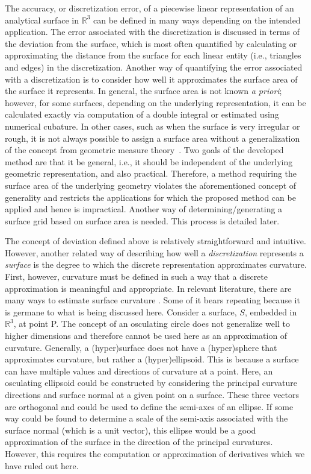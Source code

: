 The accuracy, or discretization error, of a piecewise linear
representation of an analytical surface in ${\mathbb R}^3$ can be
defined in many ways depending on the intended application. The error
associated with the discretization is discussed in terms of the
deviation from the surface, which is most often quantified by calculating 
or approximating the distance from the surface for each linear entity
(i.e., triangles and edges) in the discretization.  Another way of 
quantifying
the error associated with a discretization is to consider how well
it approximates the surface area of the surface it represents.  In
general, the surface area is not known {\it a priori}; however, for some
surfaces, depending on the underlying representation, it can be 
calculated exactly via computation of a double integral or estimated using 
numerical cubature.  In other cases, such as when the surface is very 
irregular or rough, it is not always possible to assign a surface area
without a generalization of the concept from geometric measure 
theory~\cite{gmt}.  Two goals of the developed 
method are that it be general, i.e., it 
should be independent of the underlying geometric representation, and 
also practical.  Therefore, a method requiring the surface area of the 
underlying geometry violates the aforementioned concept of 
generality and restricts the applications for which the proposed method 
can be applied and hence is impractical.  Another way of 
determining/generating a surface grid based on surface area is needed. 
This process is detailed later.

The concept of deviation defined above is relatively straightforward and
intuitive. However, another related way of describing how well a
\textit{discretization} represents a \textit{surface} is the degree to
which the discrete representation approximates curvature. First,
however, curvature must be defined in such a way that a discrete
approximation is meaningful and appropriate. In relevant literature,
there are many ways to estimate surface curvature \cite{hermann07}. Some
of it bears repeating because it is germane to what is being discussed
here.  Consider a surface, $S$, embedded in ${\mathbb R}^3$, at point P.
The concept of an osculating circle \cite{weissteineOsculatingCircle}
does not generalize well to higher dimensions and therefore cannot be
used here as an approximation of curvature. Generally, a (hyper)surface
does not have a (hyper)sphere that approximates curvature, but rather a
(hyper)ellipsoid. This is because a surface can have multiple values and
directions of curvature at a point. Here, an osculating ellipsoid could
be constructed by considering the principal curvature directions and
surface normal at a given point on a surface. These three vectors are
orthogonal and could be used to define the semi-axes of an ellipse. If
some way could be found to determine a scale of the semi-axis associated
with the surface normal (which is a unit vector), this ellipse would be
a good approximation of the surface in the direction of the principal
curvatures. However, this requires the computation or approximation of
derivatives which we have ruled out here.

